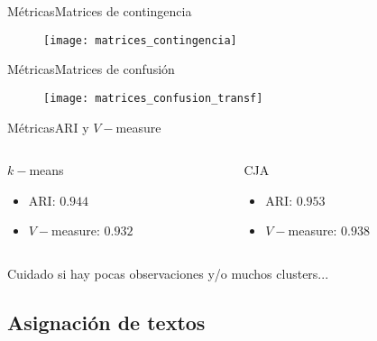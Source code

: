\documentclass[aspectratio = 169]{beamer}
\begin{document}
			\begin{frame}{Métricas}{Matrices de contingencia}
				\begin{figure}
					\centering
					\texttt{[image: matrices\_contingencia]}
					\label{fig:matrices_contingencia}
				\end{figure} 
			\end{frame}
			
			\begin{frame}{Métricas}{Matrices de confusión}
				\begin{figure}
					\centering
					\texttt{[image: matrices\_confusion\_transf]}
					\label{fig:matrices_confusion_transf}
				\end{figure} 
			\end{frame}
			
			\begin{frame}{Métricas}{ARI y $V-$measure}
				\begin{columns}
					\begin{column}{.5\textwidth}
						\begin{block}{$k-$means}
							\begin{itemize}
								\item ARI: $0.944$
								\item $V-$measure: $0.932$
							\end{itemize}
						\end{block}
					\end{column}
					\begin{column}{.5\textwidth}
						\begin{block}{CJA}
							\begin{itemize}
								\item ARI: $0.953$
								\item $V-$measure: $0.938$
							\end{itemize}
						\end{block}
					\end{column}
				\end{columns}
				\vfill\centering Cuidado si hay pocas observaciones y/o muchos clusters...
			\end{frame}
			
		\subsection{Asignación de textos}
		
\end{document}
